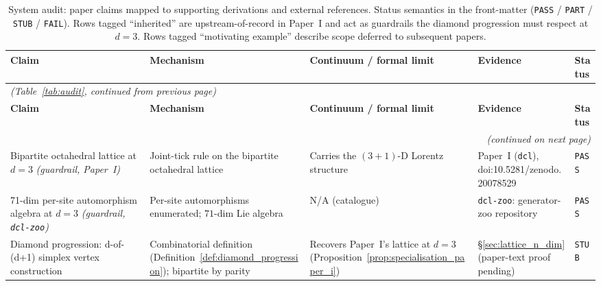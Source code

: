{\scriptsize
\setlength{\tabcolsep}{4pt}
\renewcommand{\arraystretch}{0.95}
\begin{longtable}{@{}p{2.8cm}p{3.8cm}p{3.0cm}p{4.4cm}p{1.0cm}@{}}
\caption{\small System audit: paper claims mapped to supporting
derivations and external references.  Status semantics in the
front-matter (\texttt{PASS} / \texttt{PART} / \texttt{STUB} /
\texttt{FAIL}).  Rows tagged ``inherited'' are upstream-of-record
in Paper~I and act as guardrails the diamond progression must
respect at $d = 3$.  Rows tagged ``motivating example'' describe
scope deferred to subsequent papers.}
\label{tab:audit_caption} \\
\hline
\textbf{Claim} & \textbf{Mechanism} & \textbf{Continuum / formal limit} & \textbf{Evidence} & \textbf{Status} \\
\hline
\endfirsthead

\multicolumn{5}{l}{\textit{(Table~\ref{tab:audit}, continued from previous page)}} \\
\hline
\textbf{Claim} & \textbf{Mechanism} & \textbf{Continuum / formal limit} & \textbf{Evidence} & \textbf{Status} \\
\hline
\endhead

\hline
\multicolumn{5}{r}{\textit{(continued on next page)}} \\
\endfoot

\hline
\endlastfoot

Bipartite octahedral lattice at $d = 3$ \emph{(guardrail, Paper~I)}
    & Joint-tick rule on the bipartite octahedral lattice
    & Carries the $(3+1)$-D Lorentz structure
    & Paper~I (\texttt{dcl}), doi:10.5281/zenodo.20078529
    & \texttt{PASS} \\

71-dim per-site automorphism algebra at $d=3$ \emph{(guardrail, \texttt{dcl-zoo})}
    & Per-site automorphisms enumerated; $71$-dim Lie algebra
    & N/A (catalogue)
    & \texttt{dcl-zoo}: generator-zoo repository
    & \texttt{PASS} \\

Diamond progression: d-of-(d+1) simplex vertex construction
    & Combinatorial definition (Definition~\ref{def:diamond_progression}); bipartite by parity
    & Recovers Paper~I's lattice at $d = 3$ (Proposition~\ref{prop:specialisation_paper_i})
    & \S\ref{sec:lattice_n_dim} (paper-text proof pending)
    & \texttt{STUB} \\


\end{longtable}}
